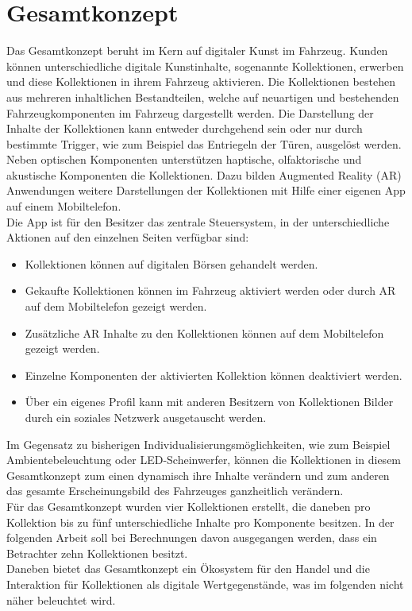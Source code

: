 \section{Gesamtkonzept}
Das Gesamtkonzept beruht im Kern auf digitaler Kunst im Fahrzeug. Kunden können unterschiedliche digitale Kunstinhalte, sogenannte Kollektionen, erwerben und diese Kollektionen in ihrem Fahrzeug aktivieren. Die Kollektionen bestehen aus mehreren inhaltlichen Bestandteilen, welche auf neuartigen und bestehenden Fahrzeugkomponenten im Fahrzeug dargestellt werden. Die Darstellung der Inhalte der Kollektionen kann entweder durchgehend sein oder nur durch bestimmte Trigger, wie zum Beispiel das Entriegeln der Türen, ausgelöst werden. \\
Neben optischen Komponenten unterstützen haptische, olfaktorische und akustische Komponenten die Kollektionen. Dazu bilden Augmented Reality (AR) Anwendungen weitere Darstellungen der Kollektionen mit Hilfe einer eigenen App auf einem Mobiltelefon.\\
Die App ist für den Besitzer das zentrale Steuersystem, in der unterschiedliche Aktionen auf den einzelnen Seiten verfügbar sind:
\begin{itemize}
	\item Kollektionen können auf digitalen Börsen gehandelt werden.
	\item Gekaufte Kollektionen können im Fahrzeug aktiviert werden oder durch AR auf dem Mobiltelefon gezeigt werden.
	\item Zusätzliche AR Inhalte zu den Kollektionen können auf dem Mobiltelefon gezeigt werden.
	\item Einzelne Komponenten der aktivierten Kollektion können deaktiviert werden.
	\item Über ein eigenes Profil kann mit anderen Besitzern von Kollektionen Bilder durch ein soziales Netzwerk ausgetauscht werden.
\end{itemize}
Im Gegensatz zu bisherigen Individualisierungsmöglichkeiten, wie zum Beispiel Ambientebeleuchtung oder LED-Scheinwerfer, können die Kollektionen in diesem Gesamtkonzept zum einen dynamisch ihre Inhalte verändern und zum anderen das gesamte Erscheinungsbild des Fahrzeuges ganzheitlich verändern. \\
Für das Gesamtkonzept wurden vier Kollektionen erstellt, die daneben pro Kollektion bis zu fünf unterschiedliche Inhalte pro Komponente besitzen. In der folgenden Arbeit soll bei Berechnungen davon ausgegangen werden, dass ein Betrachter zehn Kollektionen besitzt. \\
Daneben bietet das Gesamtkonzept ein Ökosystem für den Handel und die Interaktion für Kollektionen als digitale Wertgegenstände, was im folgenden nicht näher beleuchtet wird.
